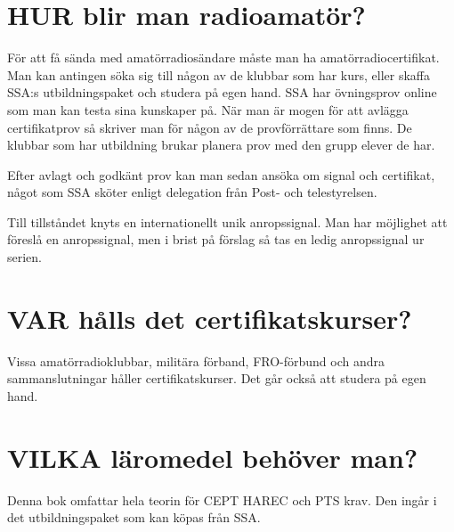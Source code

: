 \section*{HUR blir man radioamatör?}

För att få sända med amatörradiosändare måste man ha amatörradiocertifikat.
Man kan antingen söka sig till någon av de klubbar som har kurs, eller skaffa
SSA:s utbildningspaket och studera på egen hand.
SSA har övningsprov online som man kan testa sina kunskaper på.
När man är mogen för att avlägga certifikatprov så skriver man för någon av de
provförrättare som finns.
De klubbar som har utbildning brukar planera prov med den grupp elever de har.

Efter avlagt och godkänt prov kan man sedan ansöka om signal och certifikat,
något som SSA sköter enligt delegation från Post- och telestyrelsen.

Till tillståndet knyts en internationellt unik anropssignal.
Man har möjlighet att föreslå en anropssignal, men i brist på förslag så tas en
ledig anropssignal ur serien.

\section*{VAR hålls det certifikatskurser?}

Vissa amatörradioklubbar, militära förband, FRO-förbund och andra
sammanslutningar håller certifikatskurser.
Det går också att studera på egen hand.

\section*{VILKA läromedel behöver man?}

Denna bok omfattar hela teorin för CEPT HAREC och PTS krav.
Den ingår i det utbildningspaket som kan köpas från SSA.
